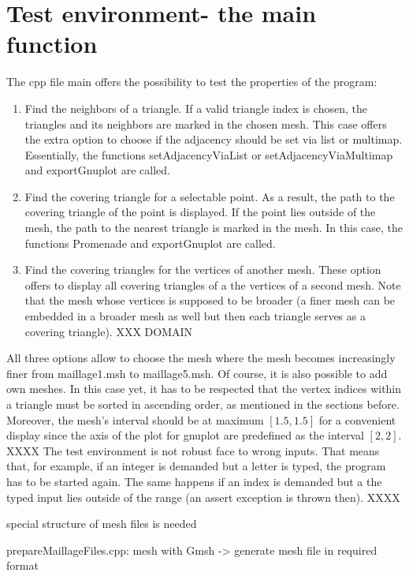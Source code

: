 \documentclass[10pt]{article}
\begin{document}
\section{Test environment- the main function}
	The cpp file main offers the possibility to test the properties of the program:
	\begin{enumerate}
		\item 
		Find the neighbors of a triangle.
		If a valid triangle index is chosen, the triangles and its neighbors are marked in the chosen mesh. This case offers the extra option to choose if the adjacency should be set via list or multimap. Essentially, the functions 
		{\ttfamily setAdjacencyViaList } or {\ttfamily setAdjacencyViaMultimap} and {\ttfamily exportGnuplot} are called. 
		\item 
		Find the covering triangle for a selectable point. 
		As a result, the path to the covering triangle of the point is displayed. 
		If the point lies outside of the mesh, the path to the nearest triangle is marked in the mesh. 
		In this case, the functions {\ttfamily Promenade} and {\ttfamily exportGnuplot} are called. 
		\item 
		Find the covering triangles for the vertices of another mesh. These option offers to display all covering triangles of a the vertices of a second mesh. Note that the mesh whose vertices is supposed to be broader (a finer mesh can be embedded in a broader mesh as well but then each triangle serves as a covering triangle). XXX DOMAIN
	\end{enumerate}
	All three options allow to choose the mesh where the mesh becomes increasingly finer from maillage1.msh to maillage5.msh. 
	Of course, it is also possible to add own meshes. In this case yet, it has to be respected that the vertex indices within a triangle must be sorted in ascending order, as mentioned in the sections before. 
	Moreover, the mesh's interval should be at maximum $ [1.5,1.5] $ for a convenient display since the axis of the plot for {\ttfamily gnuplot} are predefined as the interval $ [2,2] $.  \\
	XXXX
	The test environment is not robust face to wrong inputs. That means that, for example, if an integer is demanded but a letter is typed, the program has to be started again. The same happens if an index is demanded but a the typed input lies outside of the range (an assert exception is thrown then).  
	XXXX
	 
	special structure of mesh files is needed
	
	prepareMaillageFiles.cpp: mesh with Gmsh -> generate mesh file in required format
	
\end{document}
